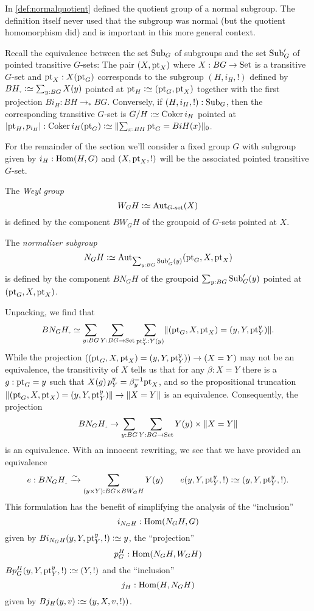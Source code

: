 \label{sec:Weyl}

In \cref{def:normalquotient} defined the quotient group of a normal subgroup.  The definition itself never used that the subgroup was normal (but the quotient homomorphism did) and is important in this more general context.

Recall the equivalence between the set $\mathrm{Sub}_G$ of subgroups and the set $\mathrm{Sub}_G'$ of pointed transitive $G$-sets: The pair $(X,\mathrm{pt}_X)$ where $X:BG\to\mathrm{Set}$ is a transitive $G$-set and $\mathrm{pt}_X:X(\mathrm{pt}_G)$ corresponds to the subgroup $(H,i_H,!)$ defined by  $BH_\div\defequi\sum_{y:BG}X(y)$ pointed at $\pt_H\defequi (\pt_G,\pt_X)$ together with the first projection $Bi_H:BH\to_*BG$.  Conversely, if $(H,i_H,!):\mathrm{Sub}_G$, then the corresponding transitive $G$-set is $G/H\defequi\coker i_H$ pointed at $|\pt_H,p_{i_H}|:\coker i_H(\pt_G)\defequi\Trunc{\sum_{x:BH}\pt_G=BiH(x)}_0$.  

For the remainder of the section we'll consider a fixed group $G$ with subgroup given by $i_H:\Hom(H,G)$ and $(X,\mathrm{pt}_X,!)$ will be the associated pointed transitive $G$-set.

\begin{definition}
  
The \emph{Weyl group} \label{def:Weyl}
$$W_GH\defequi\Aut_{G\text{-set}}(X)$$ is defined by the component $BW_GH$ of the groupoid of $G$-sets pointed at $X$.

The \emph{normalizer subgroup} \label{def:normalizer}
$$N_GH\defequi\Aut_{\sum_{y:BG}\typesubgroup_G'(y)}(\pt_G,X,\pt_X)$$ is defined by the component $BN_GH$ of the groupoid $\sum_{y:BG}\mathrm{Sub}_G'(y)$ pointed at $(\mathrm{pt}_G,X,\mathrm{pt}_X)$.
\end{definition}

Unpacking, we find that
$$BN_GH_\div\oldequiv \sum_{y:BG}\sum_{Y:BG\to\Set}\sum_{\pt^y_Y:Y(y)} \Trunc{(\pt_G,X,\pt_X)=(y,Y,\pt^y_Y)}.$$
While the projection $((\mathrm{pt}_G,X,\mathrm{pt}_X)=(y,Y,\mathrm{pt}^y_Y))\to (X=Y)$ may not be an equivalence, the transitivity of $X$ tells us that for any $\beta:X=Y$ there is a $g:\mathrm{pt}_G=y$ such that $X(g)\,p^y_Y=\beta^{-1}_y\mathrm{pt}_X$, and so the propositional truncation $\lVert(\mathrm{pt}_G,X,\mathrm{pt}_X)=(y,Y,\mathrm{pt}^y_Y)\rVert \to \lVert X=Y\rVert$ is an equivalence.
Consequently, the projection
$$BN_GH_\div\to \sum_{y:BG}\sum_{Y:BG\to\Set}Y(y)\times\Trunc{X=Y}$$
is an equivalence.  With an innocent rewriting, we see that we have provided an equivalence 
$$e:BN_GH_\div\we\sum_{(y\times Y):BG\times BW_GH}Y(y)\qquad e(y,Y,\pt^y_Y,!)\defequi (y,Y,\pt^y_Y,!).$$
This formulation has the benefit of simplifying the analysis of the ``inclusion'' 
$$i_{N_GH}:\Hom(N_GH,G)$$
given by $Bi_{N_GH}(y,Y,\pt^y_Y,!)\defequi y$, the ``projection''
 $$p_G^H:\Hom(N_GH,W_GH)$$
$Bp_G^H(y,Y,\pt^y_Y,!)\defequi (Y,!)$ and the ``inclusion''
$$j_H:\Hom(H,N_GH)$$
given by $Bj_H(y,v)\defequi(y,X,v,!))$.



